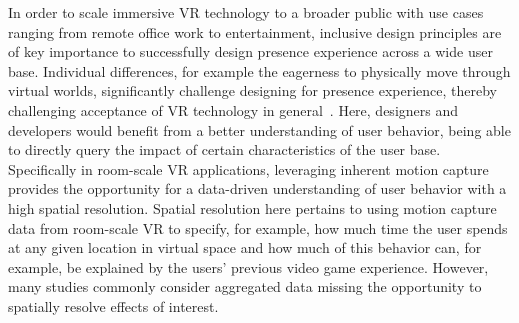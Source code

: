 In order to scale immersive VR technology to a broader public with use cases ranging from remote office work to entertainment, inclusive design principles are of key importance to successfully design presence experience across a wide user base. Individual differences, for example the eagerness to physically move through virtual worlds, significantly challenge designing for presence experience, thereby challenging acceptance of VR technology in general~\cite{Sagnier2020}. Here, designers and developers would benefit from a better understanding of user behavior, being able to directly query the impact of certain characteristics of the user base. Specifically in room-scale VR applications, leveraging inherent motion capture provides the opportunity for a data-driven understanding of user behavior with a high spatial resolution. Spatial resolution here pertains to using motion capture data from room-scale VR to specify, for example, how much time the user spends at any given location in virtual space and how much of this behavior can, for example, be explained by the users' previous video game experience. However, many studies commonly consider aggregated data missing the opportunity to spatially resolve effects of interest.


